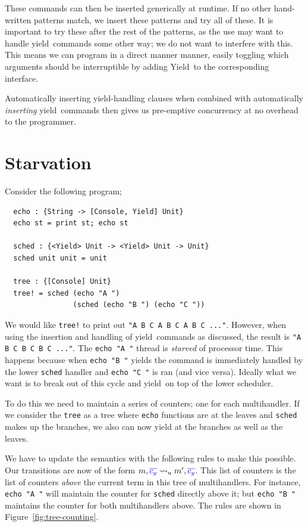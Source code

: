 \documentclass[msc,deptreport,cs]{infthesis} %
\newcommand{\code}[1]{\lstinline{#1}}
\newcommand{\counter}{{\color{blue}c_y}}
\newcommand{\bluetext}[1]{{\color{blue}#1}}
\newcommand\yield{\textsf{yield}\xspace}
\newcommand\Yield{\textsf{Yield}\xspace}
\newcommand{\many}{\overline}
\newcommand{\redtou}{\leadsto_{\mathrm{u}}}
\begin{document}
These commands can then be inserted generically at runtime. If no other
hand-written patterns match, we insert these patterns and try all of these. It
is important to try these after the rest of the patterns, as the use may want to
handle \yield~commands some other way; we do not want to interfere with this.
This means we can program in a direct manner manner, easily toggling which
arguments should be interruptible by adding \Yield~to the corresponding interface.

Automatically inserting \yield-handling clauses when combined with automatically
\emph{inserting} \yield~commands then gives us pre-emptive concurrency at no
overhead to the programmer.

\section{Starvation}

Consider the following program;

\begin{lstlisting}
  echo : {String -> [Console, Yield] Unit}
  echo st = print st; echo st

  sched : {<Yield> Unit -> <Yield> Unit -> Unit}
  sched unit unit = unit

  tree : {[Console] Unit}
  tree! = sched (echo "A ")
                (sched (echo "B ") (echo "C "))
\end{lstlisting}

We would like \code{tree!} to print out \code{"A B C A B C A B C ..."}. However, when
using the insertion and handling of \yield~commands as discussed, the result is
\code{"A B C B C B C ..."}. The \code{echo "A "} thread is \emph{starved} of
processor time. This happens because when \code{echo "B "} yields the command
is immediately handled by the lower \code{sched} handler and \code{echo "C "}
is ran (and vice versa). Ideally what we want is to break out of this cycle
and \yield~on top of the lower scheduler.

To do this we need to maintain a series of counters; one for each multihandler.
If we consider the \code{tree} as a tree where \code{echo} functions are at
the leaves and \code{sched} makes up the branches, we also can now yield at the
branches as well as the leaves.

We have to update the semantics with the following rules to make this possible.
Our transitions are now of the form $m, \bluetext{\many{\counter}} \redtou m',
\bluetext{\many{\counter}}$. This list of counters is the list of counters
\emph{above} the current term in this tree of multihandlers. For instance,
\code{echo "A "} will maintain the counter for \code{sched} directly above it;
but \code{echo "B "} maintains the counter for both multihandlers above. The
rules are shown in Figure~\ref{fig:tree-counting}.
\end{document}

